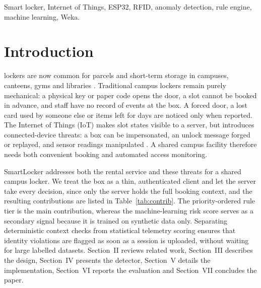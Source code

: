 \documentclass[journal,onecolumn]{IEEEtran}
\begin{document}
\begin{IEEEkeywords}
Smart locker, Internet of Things, ESP32, RFID, anomaly detection, rule engine, machine learning, Weka.
\end{IEEEkeywords}

\section{Introduction}

 lockers are now common for parcels and short-term storage in campuses, canteens, gyms
and libraries \cite{iwan2016parcel}. Traditional campus lockers remain purely mechanical: a physical key or paper code
opens the door, a slot cannot be booked in advance, and staff have no record of events at the box. A forced door, a lost
card used by someone else or items left for days are noticed only when reported. The Internet of Things (IoT)
\cite{alfuqaha2015iot} makes slot states visible to a server, but introduces connected-device threats: a box can be
impersonated, an unlock message forged or replayed, and sensor readings manipulated \cite{sicari2015security,
roman2013features}. A shared campus facility therefore needs both convenient booking and automated access monitoring.

SmartLocker addresses both the rental service and these threats for a shared campus locker. We treat the box as a thin,
authenticated client and let the server take every decision, since only the server holds the full booking context, and
the resulting contributions are listed in Table~\ref{tab:contrib}. The priority-ordered rule tier is the main
contribution, whereas the machine-learning risk score serves as a secondary signal because it is trained on synthetic
data only. Separating deterministic context checks from statistical telemetry scoring ensures that identity violations
are flagged as soon as a session is uploaded, without waiting for large labelled datasets. Section~II reviews related
work, Section~III describes the design, Section~IV presents the detector, Section~V details the implementation,
Section~VI reports the evaluation and Section~VII concludes the paper.
\end{document}
